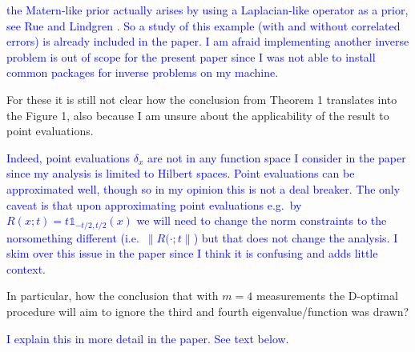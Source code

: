 \documentclass{amsart}
\newcommand{\answer}[1]{\vskip 0.05in \textcolor{blue}{#1} \vskip 0.05in}
\begin{document}
\begin{itemize}
  \answer{the Matern-like prior actually arises by using a
  Laplacian-like operator as a prior, see Rue and Lindgren \cite{}. So
  a study of this example (with and without correlated errors) is
  already included in the paper. I am afraid implementing another
  inverse problem is out of scope for the present paper since I was
  not able to install common packages for inverse problems on my machine. }

  For these it is still not clear how the conclusion from Theorem 1
  translates into the Figure 1, also because I am unsure about the
  applicability of the result to point evaluations.

  \answer{Indeed, point evaluations $\delta_x$ are not in any
  function space I consider in the paper since my analysis is limited
  to Hilbert spaces. Point evaluations can be approximated well,
  though so in my opinion this is not a deal breaker. The only caveat
  is that upon approximating point evaluations e.g.~by $R(x;t) =
  t\mathbb{1}_{-t/2, t/2}(x)$ we will need to change the norm
  constraints to the norsomething different (i.e.~$\|R(\cdot;t\|$) but
  that does not change the analysis. I skim over this issue in the
  paper since I think it is confusing and adds little context.}
  
  In particular, how the conclusion that with $m = 4$ measurements the
  D-optimal procedure will aim to ignore the third and fourth
  eigenvalue/function was drawn?

  \answer{I explain this in more detail in the paper. See text below.}

  
\end{itemize}
\end{document}

